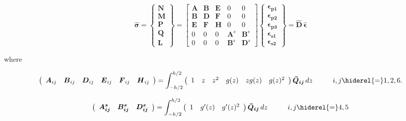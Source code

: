 \documentclass[3p,preprint,12pt]{elsarticle}
\begin{document}
\begin{equation}
\boldsymbol{\hat{\sigma}} =\left\{ \begin{array}{c}
\boldsymbol{N}\\
\boldsymbol{M}\\
\boldsymbol{P}\\
\boldsymbol{Q}\\
\boldsymbol{L}
\end{array}\right\} =\left[\begin{array}{ccccc}
\boldsymbol{A} & \boldsymbol{B} & \boldsymbol{E} & 0 & 0\\
\boldsymbol{B} & \boldsymbol{D} & \boldsymbol{F} & 0 & 0\\
\boldsymbol{E} & \boldsymbol{F} & \boldsymbol{H} & 0 & 0\\
0 & 0 & 0 & \boldsymbol{A}^{s} & \boldsymbol{B}^{s}\\
0 & 0 & 0 & \boldsymbol{B}^{s} & \boldsymbol{D}^{s}
\end{array}\right]\left\{ \begin{array}{c}
\boldsymbol{\epsilon_{p1}}\\
\boldsymbol{\epsilon_{p2}}\\
\boldsymbol{\epsilon_{p3}}\\
\boldsymbol{\epsilon_{s1}}\\
\boldsymbol{\epsilon_{s2}}
\end{array}\right\} = \boldsymbol{\hat{D}} \, \boldsymbol{\hat{\epsilon}} 
\end{equation}

where

\begin{equation*}
\begin{gathered}
\left(\begin{array}{cccccc}
\boldsymbol	A_{ij} & 	\boldsymbol B_{ij}& 	\boldsymbol D_{ij}& 	\boldsymbol E_{ij}&	\boldsymbol F_{ij} & 	\boldsymbol H_{ij} \end{array}\right)
=\int_{-h/2}^{h/2}\left(\begin{array}{cccccc}
1 & z & z^2 & g(z) & zg(z) & g(z)^2 \end{array}\right) \boldsymbol{\bar{Q}_{ij}} \,  dz	\hspace{1cm} i,j\hiderel{=}1,2,6 .
\end{gathered}
\end{equation*}

\begin{equation*}
\begin{gathered}
\left(\begin{array}{ccc}
\boldsymbol{A_{ij}^{s}} & \boldsymbol{B_{ij}^{s}} & \boldsymbol{D_{ij}^{s}}\end{array}\right)=\int_{-h/2}^{h/2}\left(\begin{array}{ccc}
1 & g^{\prime}(z) & g^{\prime}(z)^{2}\end{array}\right) \boldsymbol{\bar{Q}_{ij}} \, dz \hspace{1cm} i,j\hiderel{=}4,5
\end{gathered}
\end{equation*}
\end{document}
